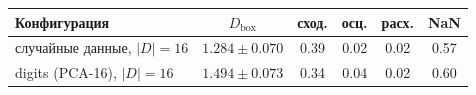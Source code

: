 \begin{tabular}{lccccc}
\toprule
Конфигурация & $D_{\mathrm{box}}$ & сход. & осц. & расх. & NaN\\
\midrule
случайные данные, $|D|=16$ & $1.284 \pm 0.070$ & 0.39 & 0.02 & 0.02 & 0.57\\
digits (PCA-16), $|D|=16$ & $1.494 \pm 0.073$ & 0.34 & 0.04 & 0.02 & 0.60\\
\bottomrule
\end{tabular}
